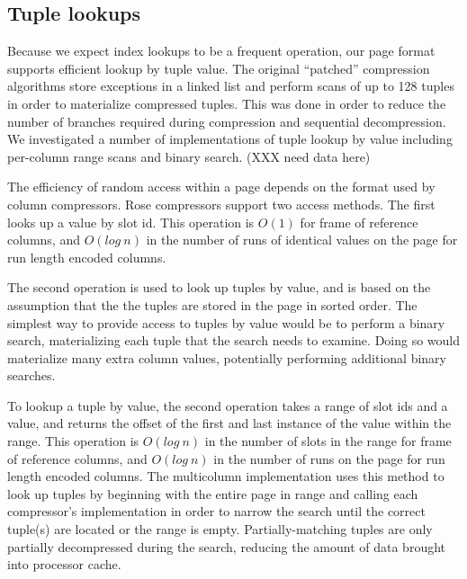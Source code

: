 \documentclass{vldb}
\newcommand{\rows}{Rose\xspace}
\begin{document}
\subsection{Tuple lookups}

Because we expect index lookups to be a frequent operation, our
page format supports efficient lookup by tuple value.  The original
``patched'' compression algorithms store exceptions in a linked list
and perform scans of up to 128 tuples in order to materialize compressed
tuples.  This was done in order to reduce the number of branches
required during compression and sequential decompression.  We
investigated a number of implementations of tuple lookup by value
including per-column range scans and binary search.  (XXX need data
here)

The efficiency of random access within a
page depends on the format used by column compressors.  \rows
compressors support two access methods.  The first looks up a value by
slot id.  This operation is $O(1)$ for frame of reference columns, and
$O(log~n)$ in the number of runs of identical values on the page for
run length encoded columns.

The second operation is used to look up tuples by value, and is based
on the assumption that the the tuples are stored in the
page in sorted order.  The simplest way to provide access to tuples by
value would be to perform a binary search, materializing each tuple
that the search needs to examine.  Doing so would materialize many
extra column values, potentially performing additional binary searches.

To lookup a tuple by value, the second operation takes a range of slot
ids and a value, and returns the offset of the first and last instance
of the value within the range.  This operation is $O(log~n)$ in the
number of slots in the range for frame of reference columns, and
$O(log~n)$ in the number of runs on the page for run length encoded
columns.  The multicolumn implementation uses this method to look up
tuples by beginning with the entire page in range and calling each
compressor's implementation in order to narrow the search until the
correct tuple(s) are located or the range is empty.
Partially-matching tuples are only partially decompressed during the
search, reducing the amount of data brought into processor cache.
\end{document}
